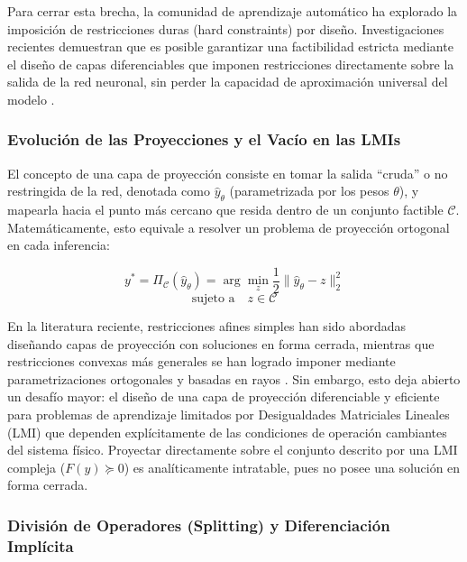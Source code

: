 Para cerrar esta brecha, la comunidad de aprendizaje automático ha explorado la imposición de restricciones duras (hard constraints) por diseño. Investigaciones recientes demuestran que es posible garantizar una factibilidad estricta mediante el diseño de capas diferenciables que imponen restricciones directamente sobre la salida de la red neuronal, sin perder la capacidad de aproximación universal del modelo \cite{min2024hardnet}.

\subsubsection{Evolución de las Proyecciones y el Vacío en las LMIs}

El concepto de una capa de proyección consiste en tomar la salida ``cruda'' o no restringida de la red, denotada como $\hat{y}_\theta$ (parametrizada por los pesos $\theta$), y mapearla hacia el punto más cercano que resida dentro de un conjunto factible $\mathcal{C}$. Matemáticamente, esto equivale a resolver un problema de proyección ortogonal en cada inferencia:

\begin{equation}
    y^* = \Pi_{\mathcal{C}}(\hat{y}_\theta) = \arg\min_{z} \frac{1}{2} \| \hat{y}_\theta - z \|_2^2
    \label{eq:proyeccion_general}
\end{equation}
\begin{equation*}
    \text{sujeto a} \quad z \in \mathcal{C}
\end{equation*}

En la literatura reciente, restricciones afines simples han sido abordadas diseñando capas de proyección con soluciones en forma cerrada, mientras que restricciones convexas más generales se han logrado imponer mediante parametrizaciones ortogonales y basadas en rayos \cite{grontas2026pinet}. Sin embargo, esto deja abierto un desafío mayor: el diseño de una capa de proyección diferenciable y eficiente para problemas de aprendizaje limitados por Desigualdades Matriciales Lineales (LMI) que dependen explícitamente de las condiciones de operación cambiantes del sistema físico. Proyectar directamente sobre el conjunto descrito por una LMI compleja ($F(y) \succeq 0$) es analíticamente intratable, pues no posee una solución en forma cerrada.

\subsubsection{División de Operadores (Splitting) y Diferenciación Implícita}

